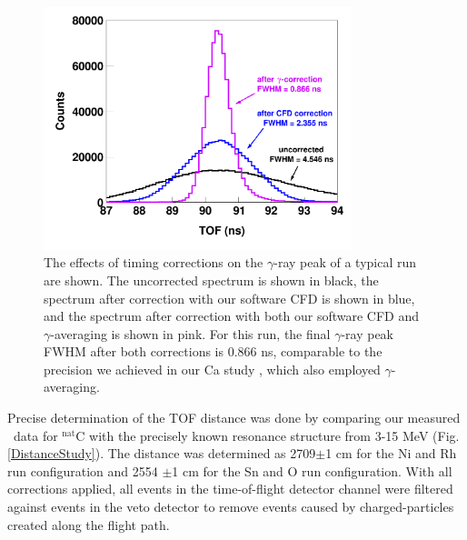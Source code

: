 \begin{figure}[h]
    \centering
    \includegraphics[width=0.8\textwidth]{figures/TimeCorrections.png}
    \caption[Improving timing precision with a software CFD and $\gamma$-ray averaging]
    {The effects of timing corrections on the $\gamma$-ray
        peak of a typical run are shown. The uncorrected spectrum is shown in black,
        the spectrum after correction with our software CFD is shown in blue,
        and the spectrum after correction with both our software CFD and
        $\gamma$-averaging is 
        shown in pink. For this run, the final $\gamma$-ray peak 
        FWHM after both corrections is 0.866 ns, comparable to the precision we
        achieved in our Ca study \cite{Shane2010}, which also employed $\gamma$-
        averaging.}
    \label{TimingCorrectionStudy}
\end{figure}

Precise determination of the TOF distance was done by comparing our measured \tot\ data
for $^{\text{nat}}$C with the precisely known resonance structure from 3-15 MeV
(Fig. \ref{DistanceStudy}). The distance was determined as 2709$\pm$1 cm for the
Ni and Rh run configuration and 2554 $\pm$1 cm 
for the Sn and O run configuration. With all corrections applied, all events in the 
time-of-flight detector channel were filtered against events in the veto detector to remove
events caused by charged-particles created along the flight path.

